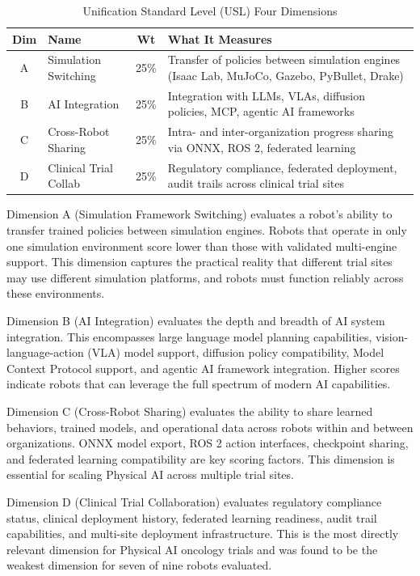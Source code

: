 \begin{table}[H]
\centering
\caption{Unification Standard Level (USL) Four Dimensions}
\label{tab:usl-dimensions}
\small
\begin{tabularx}{\textwidth}{c l c X}
\toprule
\textbf{Dim} & \textbf{Name} & \textbf{Wt} & \textbf{What It Measures} \\
\midrule
A & Simulation Switching & 25\% & Transfer of policies between simulation engines (Isaac Lab, MuJoCo, Gazebo, PyBullet, Drake) \\
B & AI Integration & 25\% & Integration with LLMs, VLAs, diffusion policies, MCP, agentic AI frameworks \\
C & Cross-Robot Sharing & 25\% & Intra- and inter-organization progress sharing via ONNX, ROS 2, federated learning \\
D & Clinical Trial Collab & 25\% & Regulatory compliance, federated deployment, audit trails across clinical trial sites \\
\bottomrule
\end{tabularx}
\end{table}

Dimension A (Simulation Framework Switching) evaluates a robot's ability to
transfer trained policies between simulation engines. Robots that operate in
only one simulation environment score lower than those with validated
multi-engine support. This dimension captures the practical reality that
different trial sites may use different simulation platforms, and robots must
function reliably across these environments.

Dimension B (AI Integration) evaluates the depth and breadth of AI system
integration. This encompasses large language model planning capabilities,
vision-language-action (VLA) model support, diffusion policy compatibility,
Model Context Protocol \cite{mcp-protocol} support, and agentic AI framework
integration. Higher scores indicate robots that can leverage the full spectrum
of modern AI capabilities.

Dimension C (Cross-Robot Sharing) evaluates the ability to share learned
behaviors, trained models, and operational data across robots within and
between organizations. ONNX model export, ROS 2 action interfaces, checkpoint
sharing, and federated learning compatibility are key scoring factors. This
dimension is essential for scaling Physical AI across multiple trial sites.

Dimension D (Clinical Trial Collaboration) evaluates regulatory compliance
status, clinical deployment history, federated learning readiness, audit trail
capabilities, and multi-site deployment infrastructure. This is the most
directly relevant dimension for Physical AI oncology trials and was found to
be the weakest dimension for seven of nine robots evaluated.

